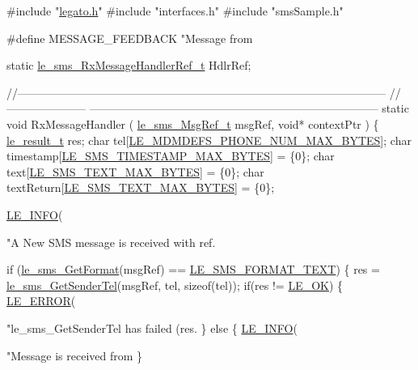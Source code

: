\begin{DoxyCodeInclude}

\textcolor{preprocessor}{#include "\hyperlink{legato_8h}{legato.h}"}
\textcolor{preprocessor}{#include "interfaces.h"}
\textcolor{preprocessor}{#include "smsSample.h"}

\textcolor{preprocessor}{#define  MESSAGE\_FEEDBACK "Message from %

\textcolor{keyword}{static} \hyperlink{le__sms__interface_8h_a77d2607cc541bf0369e69bb2d105d4bf}{le\_sms\_RxMessageHandlerRef\_t} HdlrRef;


\textcolor{comment}{//--------------------------------------------------------------------------------------------------}
\textcolor{comment}{}\textcolor{comment}{//--------------------- -----------------------------------------------------------------------------}
\textcolor{keyword}{static} \textcolor{keywordtype}{void} RxMessageHandler
(
    \hyperlink{le__sms__interface_8h_a8eb2a15362fe26516fc68fd7a7d5e3e7}{le\_sms\_MsgRef\_t} msgRef,
    \textcolor{keywordtype}{void}*            contextPtr
)
\{
    \hyperlink{le__basics_8h_a1cca095ed6ebab24b57a636382a6c86c}{le\_result\_t}  res;
    \textcolor{keywordtype}{char}         tel[\hyperlink{le__mdm_defs__interface_8h_ae6d4a4c7892f14d1e340f8df083d479f}{LE\_MDMDEFS\_PHONE\_NUM\_MAX\_BYTES}];
    \textcolor{keywordtype}{char}         timestamp[\hyperlink{le__sms__interface_8h_a9844280f515fbc2b393844e63aa83075}{LE\_SMS\_TIMESTAMP\_MAX\_BYTES}] = \{0\};
    \textcolor{keywordtype}{char}         text[\hyperlink{le__sms__interface_8h_a0dc5c2cec7c1fb166c47393fbb07e43f}{LE\_SMS\_TEXT\_MAX\_BYTES}] = \{0\};
    \textcolor{keywordtype}{char}         textReturn[\hyperlink{le__sms__interface_8h_a0dc5c2cec7c1fb166c47393fbb07e43f}{LE\_SMS\_TEXT\_MAX\_BYTES}] = \{0\};

    \hyperlink{le__log_8h_a23e6d206faa64f612045d688cdde5808}{LE\_INFO}(\textcolor{stringliteral}{"A New SMS message is received with ref.%

    \textcolor{keywordflow}{if} (\hyperlink{le__sms__interface_8h_a5c2b8ce7043b4732c7b0ede7c5d7118c}{le\_sms\_GetFormat}(msgRef) == \hyperlink{le__sms__interface_8h_a337778c44e63660c44fa2116699296c0a1bb6a0d76a622b1185ee879e1595dff8}{LE\_SMS\_FORMAT\_TEXT})
    \{
        res = \hyperlink{le__sms__interface_8h_a68bfd509a8a3fd4ae39bde7ac5c32d8d}{le\_sms\_GetSenderTel}(msgRef, tel, \textcolor{keyword}{sizeof}(tel));
        \textcolor{keywordflow}{if}(res != \hyperlink{le__basics_8h_a1cca095ed6ebab24b57a636382a6c86ca5066a4bcec691c6b67843b8f79656422}{LE\_OK})
        \{
            \hyperlink{le__log_8h_a353590f91b3143a7ba3a416ae5a50c3d}{LE\_ERROR}(\textcolor{stringliteral}{"le\_sms\_GetSenderTel has failed (res.%
        \}
        \textcolor{keywordflow}{else}
        \{
            \hyperlink{le__log_8h_a23e6d206faa64f612045d688cdde5808}{LE\_INFO}(\textcolor{stringliteral}{"Message is received from %
        \}

}}}}
\end{DoxyCodeInclude}
